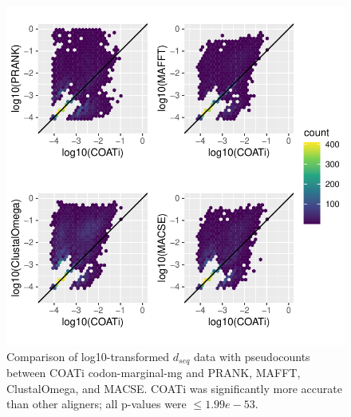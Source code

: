 \documentclass[
]{article}
\begin{document}
\begin{figure}

{\centering \includegraphics{figures/dseq_plots_mar-mg} 

}

\caption{\label{fig:dseq-mar-mg} Comparison of log10-transformed $d_{seq}$ data with pseudocounts between COATi codon-marginal-mg and PRANK, MAFFT, ClustalOmega, and MACSE. COATi was significantly more accurate than other aligners; all p-values were $\leq 1.99e-53$.}\label{fig:dseq3}
\end{figure}
\end{document}

